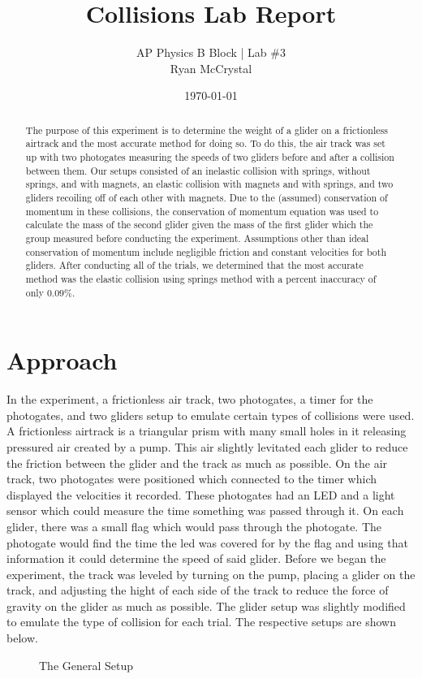 \documentclass[12pt]{article}
\title{Collisions Lab Report}
\author{AP Physics B Block | Lab \#3\\Ryan McCrystal}
\date{\today}
\begin{document}
\maketitle
\newpage
\singlespacing
\tableofcontents
\doublespacing
\newpage

\begin{abstract}
The purpose of this experiment is to determine the weight of a glider on a frictionless airtrack and the most accurate method for doing so. To do this, the air track was set up with two photogates measuring the speeds of two gliders before and after a collision between them. Our setups consisted of an inelastic collision with springs, without springs, and with magnets, an elastic collision with magnets and with springs, and two gliders recoiling off of each other with magnets. Due to the (assumed) conservation of momentum in these collisions, the conservation of momentum equation was used to calculate the mass of the second glider given the mass of the first glider which the group measured before conducting the experiment. Assumptions other than ideal conservation of momentum include negligible friction and constant velocities for both gliders. After conducting all of the trials, we determined that the most accurate method was the elastic collision using springs method with a percent inaccuracy of only $0.09\%$. %
\end{abstract}
\newpage

\section{Approach}

In the experiment, a frictionless air track, two photogates, a timer for the photogates, and two gliders setup to emulate certain types of collisions were used. A frictionless airtrack is a triangular prism with many small holes in it releasing pressured air created by a pump. This air slightly levitated each glider to reduce the friction between the glider and the track as much as possible. On the air track, two photogates were positioned which connected to the timer which displayed the velocities it recorded. These photogates had an LED and a light sensor which could measure the time something was passed through it. On each glider, there was a small flag which would pass through the photogate. The photogate would find the time the led was covered for by the flag and using that information it could determine the speed of said glider. Before we began the experiment, the track was leveled by turning on the pump, placing a glider on the track, and adjusting the hight of each side of the track to reduce the force of gravity on the glider as much as possible. The glider setup was slightly modified to emulate the type of collision for each trial. The respective setups are shown below.
\begin{figure}[H]
    \centering
    \caption{The General Setup}
\end{figure}
\end{document}
